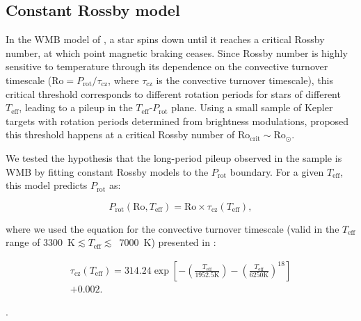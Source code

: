 \documentclass[trackchanges,twocolumn]{aastex631}
\newcommand{\lamostmcq}{LAMOST--McQuillan\xspace}
\newcommand{\teff}{\ensuremath{T_{\mathrm{eff}}}\xspace}
\newcommand{\prot}{\ensuremath{P_\mathrm{rot}}\xspace}
\begin{document}
\subsection{Constant Rossby model}
\label{subsec:rossby}
In the WMB model of \citet{vanSaders2016, vanSaders2019}, a star spins down until it reaches a critical Rossby number, at which point magnetic braking ceases. Since Rossby number is highly sensitive to temperature through its dependence on the convective turnover timescale ($\mathrm{Ro} = P_\mathrm{rot}/\tau_\mathrm{cz}$, where $\tau_\mathrm{cz}$ is the convective turnover timescale), this critical threshold corresponds to different rotation periods for stars of different \teff, leading to a pileup in the \teff-\prot plane. Using a small sample of Kepler targets with rotation periods determined from brightness modulations, \citet{vanSaders2016} proposed this threshold happens at a critical Rossby number of $\mathrm{Ro_{crit}} \sim \mathrm{Ro_\odot}$. 

We tested the hypothesis that the long-period pileup observed in the \edit1{\lamostmcq} sample is  WMB  by fitting constant Rossby models to the \prot boundary. For a given \teff, this model predicts \prot as: 

\begin{equation} \label{eq:1}
    \prot (\mathrm{Ro}, \teff) = \mathrm{Ro} \times \tau_\mathrm{cz}(\teff),
\end{equation}

where we used the equation for the convective turnover timescale (valid in the \teff range of 3300~K$\lesssim \teff \lesssim$~7000~K) presented in \citet{CranmerSaar2011} :

\begin{multline} \label{eq:2}
\tau_\mathrm{cz}(\teff) = 314.24\exp \left [ -\left (\frac{T_\mathrm{eff}}{1952.5 \mathrm{K}}  \right ) - \left (\frac{T_\mathrm{eff}}{6250 \mathrm{K}}  \right )^{18} \right ] \\+ 0.002.
\end{multline}

. 
\end{document}
